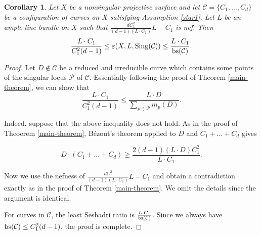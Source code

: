 \documentclass[12pt,reqno]{amsart}
\theoremstyle{plain}
\numberwithin{equation}{section}
\newtheorem{corollary}[theorem]{Corollary}
\theoremstyle{definition}
\begin{document}
\begin{corollary}\label{cor-main}
Let $X$ be a nonsingular projective surface and let $\mathcal{C} = \{C_{1}, \ldots, C_{d}\}$ be a configuration of curves on $X$ satisfying Assumption \ref{star1}.
 Let $L$ be an ample line bundle on $X$
		such that  $\frac{dC_1^2}{(d-1)(L\cdot C_1)}L-C_1$ is nef.   Then
$$\frac{L\cdot C_1}{C_1^2(d-1)} \le \varepsilon(X, L,{\rm Sing}(\mathcal{C})) \le \frac{L \cdot C_1}{{\rm bs} (\mathcal{C})}  .$$
\end{corollary} 
\begin{proof}

Let  $D \notin \mathcal{C}$ be 
a reduced and irreducible curve which contains some points of the singular locus $\mathcal{P}$ of $\mathcal{C}$. Essentially following the proof of Theorem \ref{main-theorem}, we can show that 
$$ \frac{L\cdot C_1}{C_1^2(d-1)} \le \frac{L \cdot D}{\sum_{p \in \mathcal{P}} m_{p}(D)}.$$


Indeed, suppose that the above inequality does not hold. 
As in the proof of Theoerem \ref{main-theorem}, B\'ezout's theorem applied to $D$ and $C_1+\dots+C_d$ gives
		

$$		 D\cdot (C_{1}+ \ldots + C_{d}) \ge  
\frac{2(d-1)(L \cdot D)C_1^2}{L\cdot C_1}.$$

		Now we use the nefness of 
  $\frac{dC_1^2}{(d-1)(L\cdot C_1)}L-C_1$ and obtain a contradiction exactly as in the proof of Theorem \ref{main-theorem}. We omit the details since the argument is identical. 


For curves in $\mathcal{C}$, the least Seshadri ratio is  $\frac{L \cdot C_1}{\rm{bs} (\mathcal{C})}$. 
Since we always have ${\rm bs} (\mathcal{C}) \le C_1^2(d-1)$, the proof is complete. 
\end{proof}
\end{document}
